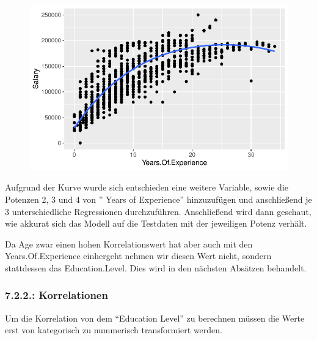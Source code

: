 \documentclass[
  letterpaper,
  DIV=11,
  numbers=noendperiod]{scrartcl}
\newenvironment{Shaded}{\begin{snugshade}}{\end{snugshade}}
\newcommand{\FunctionTok}[1]{\textcolor[rgb]{0.28,0.35,0.67}{#1}}
\newcommand{\NormalTok}[1]{\textcolor[rgb]{0.00,0.23,0.31}{#1}}
\newcommand{\OtherTok}[1]{\textcolor[rgb]{0.00,0.23,0.31}{#1}}
\newcommand{\SpecialCharTok}[1]{\textcolor[rgb]{0.37,0.37,0.37}{#1}}
\begin{document}
\begin{figure}[H]

{\centering \includegraphics{main_doc_files/figure-pdf/unnamed-chunk-126-1.pdf}

}

\end{figure}

Aufgrund der Kurve wurde sich entschieden eine weitere Variable, sowie
die Potenzen 2, 3 und 4 von '' Years of Experience'' hinzuzufügen und
anschließend je 3 unterschiedliche Regressionen durchzuführen.
Anschließend wird dann geschaut, wie akkurat sich das Modell auf die
Testdaten mit der jeweiligen Potenz verhält.

Da Age zwar einen hohen Korrelationswert hat aber auch mit den
Years.Of.Experience einhergeht nehmen wir diesen Wert nicht, sondern
stattdessen das Education.Level. Dies wird in den nächsten Absätzen
behandelt.

\hypertarget{korrelationen-2}{%
\subsubsection{7.2.2.: Korrelationen}\label{korrelationen-2}}

Um die Korrelation von dem ``Education Level'' zu berechnen müssen die
Werte erst von kategorisch zu nummerisch transformiert werden.

\begin{Shaded}
\end{Shaded}
\end{document}
